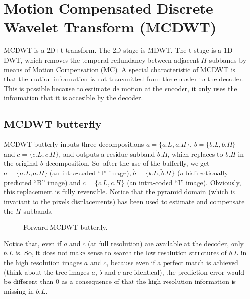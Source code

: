 \section{Motion Compensated Discrete Wavelet Transform (MCDWT)}
MCDWT is a 2D+t transform. The 2D stage is MDWT. The t stage is a
1D-DWT, which removes the temporal redundancy between adjacent $H$
subbands by means of
\href{https://en.wikipedia.org/wiki/Motion_compensation}{Motion
  Compensation (MC)}. A special characteristic of MCDWT is that the
motion information is not transmitted from the encoder to the
\href{https://en.wikipedia.org/wiki/Decoder}{decoder}. This is possible because to estimate de motion at the
encoder, it only uses the information that it is accesible by the
decoder.

\subsection{MCDWT butterfly}

MCDWT butterly inputs three decompositions $a=\{a.L, a.H\}$, $b=\{b.L,
b.H\}$ and $c=\{c.L, c.H\}$, and outputs a residue subband
$\tilde{b}.H$, which replaces to $b.H$ in the original $b$
decomposition. So, after the use of the bufferfly, we get $a=\{a.L,
a.H\}$ (an intra-coded ``I'' image), $\tilde{b}=\{b.L, \tilde{b}.H\}$
(a bidirectionally predicted ``B'' image) and $c=\{c.L, c.H\}$ (an
intra-coded ``I'' image). Obviously, this replacement is fully
reversible. Notice that the
\href{http://www.vtvt.ece.vt.edu/research/references/video/DCT_Video_Compression/Zhang92a.pdf}{pyramid
  domain} (which is invariant to the pixels displacements) has been
used to estimate and compensate the $H$ subbands.

\begin{figure}
\centering
{}
\caption{Forward MCDWT butterfly.}
\end{figure}


Notice that, even if $a$ and $c$ (at full resolution) are available at
the decoder, only $b.L$ is. So, it does not make sense to search the
low resolution structures of $b.L$ in the high resolution images $a$
and $c$, because even if a perfect match is achieved (think about the
tree images $a$, $b$ and $c$ are identical), the prediction error
would be different than $0$ as a consequence of that the high
resolution information is missing in $b.L$.

